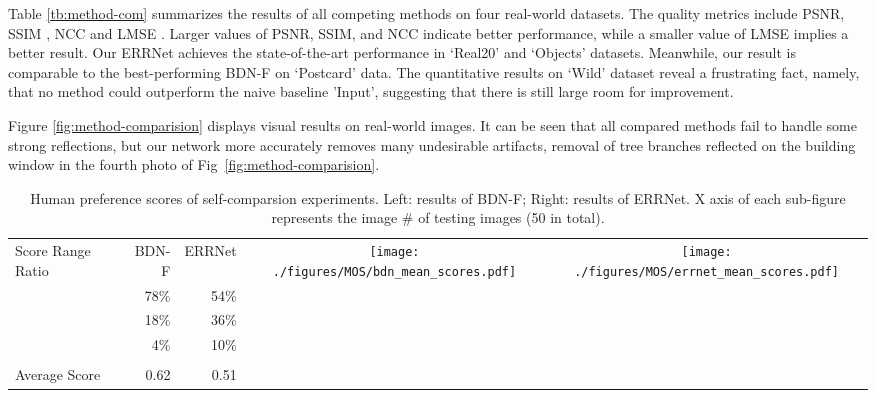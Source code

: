 \documentclass[10pt,twocolumn,letterpaper]{article}
\begin{document}
Table \ref{tb:method-com} summarizes the results of all competing
methods on four real-world datasets. The quality metrics include PSNR, SSIM \cite{wang2004image}, NCC
\cite{Xue2015ObstructionFree,Wan_2017_ICCV} and LMSE \cite{grosse2009ground}.
Larger values of PSNR, SSIM, and NCC indicate better performance, while a smaller value of LMSE implies a better result. Our ERRNet achieves the state-of-the-art
performance in `Real20' and `Objects' datasets. Meanwhile, our result is
comparable to the best-performing BDN-F on `Postcard' data. The quantitative
results on `Wild' dataset reveal a frustrating fact, namely, that no method
could outperform the naive baseline 'Input', suggesting that there is still large room
for improvement.

Figure \ref{fig:method-comparision} displays visual results on real-world
images. It can be seen that all compared methods fail to handle some strong
reflections, but our network more accurately removes many undesirable artifacts,
\eg removal of tree branches reflected on the building window in the fourth photo of Fig~\ref{fig:method-comparision}.

\begin{table*}[!htbp]
\centering
    \begin{tabular}{ l r r c c}
      \toprule
      Score Range Ratio & BDN-F & ERRNet &
      \multirow{5}{*}{\texttt{[image: ./figures/MOS/bdn\_mean\_scores.pdf]}} &  
     \multirow{5}{*}{\texttt{[image: ./figures/MOS/errnet\_mean\_scores.pdf]}} \\
  &  78\%  &  54\%  \\ \cline{1-3}
      & 18\% & 36\% \\ \cline{1-3}
     & 4\% & 10\% \\ \cline{1-3}
     
     \\
      Average Score &  0.62 & 0.51 \\ 
      \bottomrule
    \end{tabular}
    \caption{Human preference scores of self-comparsion experiments. Left:
      results of BDN-F; Right: results of ERRNet. X axis of each sub-figure  represents the image \# of testing images (50 in total).} \label{fig:MOS}
\end{table*}
\end{document}

